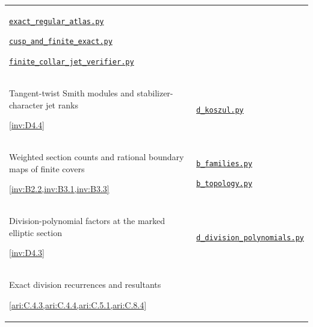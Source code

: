 {\begin{longtable}{@{}>{\raggedright\arraybackslash}p{}>{\raggedright\arraybackslash}p{}@{}}
\href{https://raw.githubusercontent.com/KokunoYumeto/s6-complex-structure-workbench/\SsixRepositoryCommit/pro_returns/S6_SERIES_GRIND_checkpoint_10_20261120T0211Z/code/current_audits/audit_paper_i/open_atlas/exact_regular_atlas.py}{\nolinkurl{exact_regular_atlas.py}}\par \href{https://raw.githubusercontent.com/KokunoYumeto/s6-complex-structure-workbench/\SsixRepositoryCommit/pro_returns/S6_SERIES_GRIND_checkpoint_10_20261120T0211Z/code/current_audits/audit_paper_i/open_atlas/cusp_and_finite_exact.py}{\nolinkurl{cusp_and_finite_exact.py}}\par \href{https://raw.githubusercontent.com/KokunoYumeto/s6-complex-structure-workbench/\SsixRepositoryCommit/pro_returns/S6_SERIES_GRIND_checkpoint_10_20261120T0211Z/code/current_audits/audit_paper_i/open_atlas/finite_collar_jet_verifier.py}{\nolinkurl{finite_collar_jet_verifier.py}} \\[3pt]
\hypertarget{prog:I:koszul}{}Tangent-twist Smith modules and stabilizer-character jet ranks\par \cref{inv:D4.4} &
\href{https://raw.githubusercontent.com/KokunoYumeto/s6-complex-structure-workbench/\SsixRepositoryCommit/pro_returns/S6_10_PAPERS_checkpoint_15_20261119T1045Z/S6_10_PAPERS/code/I/replay_invariants/d_koszul.py}{\nolinkurl{d_koszul.py}} \\[3pt]
\hypertarget{prog:I:covers}{}Weighted section counts and rational boundary maps of finite covers\par \cref{inv:B2.2,inv:B3.1,inv:B3.3} &
\href{https://raw.githubusercontent.com/KokunoYumeto/s6-complex-structure-workbench/\SsixRepositoryCommit/pro_returns/S6_01_INVARIANTS/return/code/b_families.py}{\nolinkurl{b_families.py}}\par \href{https://raw.githubusercontent.com/KokunoYumeto/s6-complex-structure-workbench/\SsixRepositoryCommit/pro_returns/S6_01_INVARIANTS/return/code/b_topology.py}{\nolinkurl{b_topology.py}} \\[3pt]
\hypertarget{prog:I:resonance}{}Division-polynomial factors at the marked elliptic section\par \cref{inv:D4.3} &
\href{https://raw.githubusercontent.com/KokunoYumeto/s6-complex-structure-workbench/\SsixRepositoryCommit/pro_returns/S6_01_INVARIANTS/return/code/d_division_polynomials.py}{\nolinkurl{d_division_polynomials.py}} \\[3pt]
\hypertarget{prog:I:division}{}Exact division recurrences and resultants\par \cref{ari:C.4.3,ari:C.4.4,ari:C.5.1,ari:C.8.4} &

\end{longtable}}

